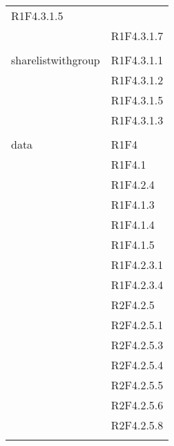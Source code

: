 \begin{center}
\begin{longtable}{|p{7cm}|p{7cm}|}
R1F4.3.1.5 \\ & R1F4.3.1.7 \\ & \\ \hline
		sharelistwithgroup & R1F4.3.1.1 \\ & R1F4.3.1.2 \\ & R1F4.3.1.5 \\ & R1F4.3.1.3 \\ & \\ \hline
		data & R1F4 \\ & R1F4.1 \\ & R1F4.2.4 \\ & R1F4.1.3 \\ & R1F4.1.4 \\ & R1F4.1.5 \\ & R1F4.2.3.1 \\ & R1F4.2.3.4 \\ & R2F4.2.5 \\ & R2F4.2.5.1 \\ & R2F4.2.5.3 \\ & R2F4.2.5.4 \\ & R2F4.2.5.5 \\ & R2F4.2.5.6 \\ & R2F4.2.5.8 \\ & \\ \hline

\end{longtable}
\end{center}
